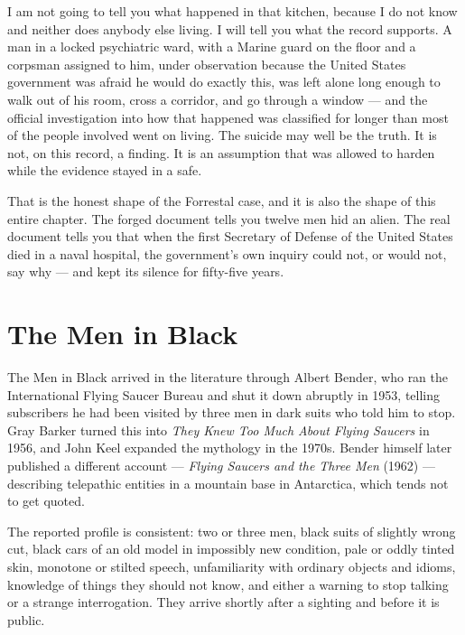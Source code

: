 
I am not going to tell you what happened in that kitchen, because I do not know and neither does
anybody else living. I will tell you what the record supports. A man in a locked psychiatric ward,
with a Marine guard on the floor and a corpsman assigned to him, under observation because the
United States government was afraid he would do exactly this, was left alone long enough to walk
out of his room, cross a corridor, and go through a window --- and the official investigation into
how that happened was classified for longer than most of the people involved went on living.
The suicide may well be the truth. It is not, on this record, a finding. It is an assumption that
was allowed to harden while the evidence stayed in a safe.

That is the honest shape of the Forrestal case, and it is also the shape of this entire chapter.
The forged document tells you twelve men hid an alien. The real document tells you that when the
first Secretary of Defense of the United States died in a naval hospital, the government's own
inquiry could not, or would not, say why --- and kept its silence for fifty-five years.

\section{The Men in Black}\label{sec:menblack}

The Men in Black arrived in the literature through Albert Bender, who ran the International
Flying Saucer Bureau and shut it down abruptly in 1953, telling subscribers he had been visited
by three men in dark suits who told him to stop. Gray Barker turned this into
\emph{They Knew Too Much About Flying Saucers} in 1956, and John Keel expanded the mythology in
the 1970s. Bender himself later published a different account --- \emph{Flying Saucers and the
Three Men} (1962) --- describing telepathic entities in a mountain base in Antarctica, which
tends not to get quoted.

The reported profile is consistent: two or three men, black suits of slightly wrong cut, black
cars of an old model in impossibly new condition, pale or oddly tinted skin, monotone or
stilted speech, unfamiliarity with ordinary objects and idioms, knowledge of things they should
not know, and either a warning to stop talking or a strange interrogation. They arrive shortly
after a sighting and before it is public.

